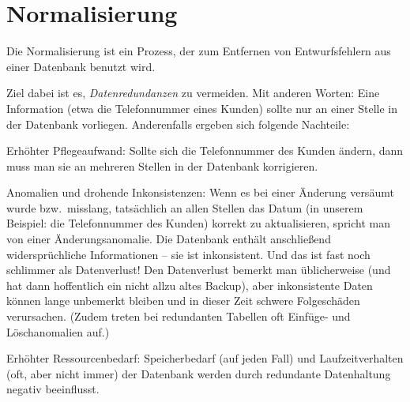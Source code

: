 \chapter{Normalisierung}
\renewcommand{\chaptertitle}{Normalisierung}

\lehead[]{\normalfont\sffamily\hspace*{-2.00cm}\textcolor{white}{\colorbox{lightblue}{\makebox[1.60cm][r]{\thechapter}}}\hspace{0.17cm}\textcolor{lightblue}{\chaptertitle}}
\rohead[]{\textcolor{lightblue}{\chaptertitle}\normalfont\sffamily\hspace*{0.17cm}\textcolor{white}{\colorbox{lightblue}{\makebox[1.60cm][l]{\thechapter}}}\hspace{-2.00cm}}
\rehead[]{\textcolor{lightblue}{AvHG, Inf, My}}
\lohead[]{\textcolor{lightblue}{AvHG, Inf, My}}

Die Normalisierung ist ein Prozess, der zum Entfernen von Entwurfsfehlern aus
einer Datenbank benutzt wird.

Ziel dabei ist es, \emph{Datenredundanzen} zu vermeiden. Mit anderen Worten:
Eine Information (etwa die Telefonnummer eines Kunden) sollte nur an einer
Stelle in der Datenbank vorliegen. Anderenfalls ergeben sich folgende Nachteile:

\begin{compactitem}
\item Erhöhter Pflegeaufwand: Sollte sich die Telefonnummer des Kunden ändern,
dann muss man sie an mehreren Stellen in der Datenbank korrigieren.
\item Anomalien und drohende Inkonsistenzen: Wenn es bei einer Änderung
versäumt wurde bzw.\ misslang, tatsächlich an allen Stellen das Datum (in
unserem Beispiel: die Telefonnummer des Kunden) korrekt zu aktualisieren,
spricht man von einer Änderungsanomalie. Die Datenbank enthält anschließend
widersprüchliche Informationen -- sie ist inkonsistent. Und das ist fast noch
schlimmer als Datenverlust! Den Datenverlust bemerkt man üblicherweise (und
hat dann hoffentlich ein nicht allzu altes Backup), aber inkonsistente Daten
können lange unbemerkt bleiben und in dieser Zeit schwere Folgeschäden
verursachen. (Zudem treten bei redundanten Tabellen oft Einfüge- und
Löschanomalien auf.)
\item Erhöhter Ressourcenbedarf: Speicherbedarf (auf jeden Fall) und
Laufzeitverhalten (oft, aber nicht immer) der Datenbank werden durch redundante
Datenhaltung negativ beeinflusst.
\end{compactitem}

